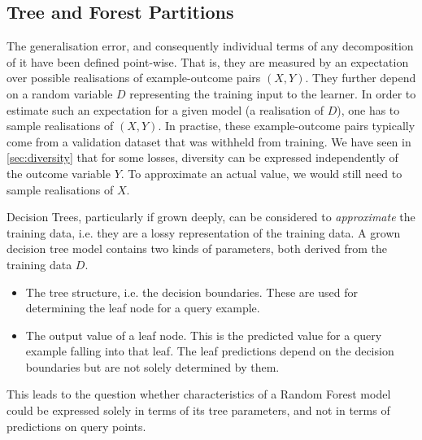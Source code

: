 \documentclass[../main.tex]{subfiles}
\begin{document}




\subsection{Tree and Forest Partitions}
\label{sec:tree-and-forest-partitions}

The generalisation error, and consequently individual terms of any decomposition of it have been defined point-wise. That is, they are measured by an expectation over possible realisations of example-outcome pairs $(X,Y)$. They further depend on a random variable $D$ representing the training input to the learner. In order to estimate such an expectation for a given model (a realisation of $D$), one has to sample realisations of $(X,Y)$. In practise, these example-outcome pairs typically come from a validation dataset that was withheld from training.
We have seen in \cref{sec:diversity} that for some losses, diversity can be expressed independently of the outcome variable $Y$. 
To approximate an actual value, we would still need to sample realisations of $X$.

Decision Trees, particularly if grown deeply, can be considered to \textit{approximate} the training data, i.e. they are a lossy representation of the training data. A grown decision tree model contains two kinds of parameters, both derived from the training data $D$.
\begin{itemize}
\item The tree structure, i.e. the decision boundaries. These are used for determining the leaf node for a query example.
\item The output value of a leaf node. This is the predicted value for a query example falling into that leaf. The leaf predictions depend on the decision boundaries but are not solely determined by them. 
\end{itemize}
This leads to the question whether characteristics of a Random Forest model could be expressed solely in terms of its tree parameters, and not in terms of predictions on query points.
\end{document}
